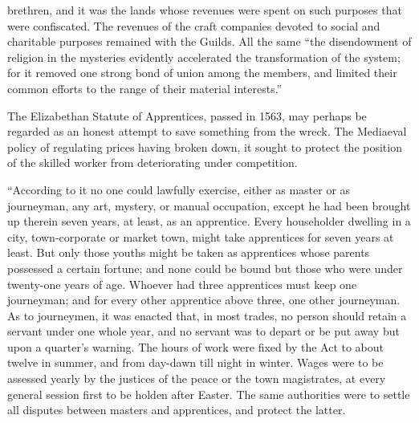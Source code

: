 \documentclass{book}
\begin{document}
brethren, and it was the lands whose revenues were spent on such purposes that were confiscated. The revenues of the craft companies devoted to social and charitable purposes remained with the Guilds. All the same “the disendowment of religion in the mysteries evidently accelerated the transformation of the system; for it removed one strong bond of union among the members, and limited their common efforts to the range of their material interests.”\footnotemark[5]

The Elizabethan Statute of Apprentices, passed in 1563, may perhaps be regarded as an honest attempt to save something from the wreck. The Mediaeval policy of regulating prices having broken down, it sought to protect the position of the skilled worker from deteriorating under competition.

“According to it no one could lawfully exercise, either as master or as journeyman, any art, mystery, or manual occupation, except he had been brought up therein seven years, at least, as an apprentice. Every householder dwelling in a city, town-corporate or market town, might take apprentices for seven years at least. But only those youths might be taken as apprentices whose parents possessed a certain fortune; and none could be bound but those who were under twenty-one years of age. Whoever had three apprentices must keep one journeyman; and for every other apprentice above three, one other journeyman. As to journeymen, it was enacted that, in most trades, no person should retain a servant under one whole year, and no servant was to depart or be put away but upon a quarter’s warning. The hours of work were fixed by the Act to about twelve in summer, and from day-dawn till night in winter. Wages were to be assessed yearly by the justices of the peace or the town magistrates, at every general session first to be holden after Easter. The same authorities were to settle all disputes between masters and apprentices, and protect the latter.\footnotemark[6]
\end{document}
